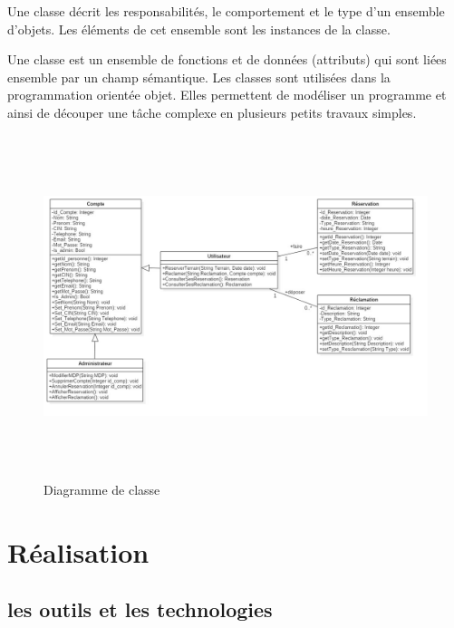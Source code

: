 \documentclass[a4paper]{report}
\begin{document}
\begin{spacing}{2}
Une classe décrit les responsabilités, le comportement et le type d'un ensemble d'objets. Les éléments de cet ensemble sont les instances de la classe.

Une classe est un ensemble de fonctions et de données (attributs) qui sont liées ensemble par un champ sémantique. Les classes sont utilisées dans la programmation orientée objet. Elles permettent de modéliser un programme et ainsi de découper une tâche complexe en plusieurs petits travaux simples.



\begin{figure}[!ht]
\begin{center}
\includegraphics[height=10cm]{image/diagramme_de_classe.jpeg}
\end{center}
\caption[Diagramme de classe]{Diagramme de classe}
\end{figure}
\cleardoublepage
 


\chapter{Réalisation}
\section{les outils et les technologies}


\end{spacing}
\end{document}
